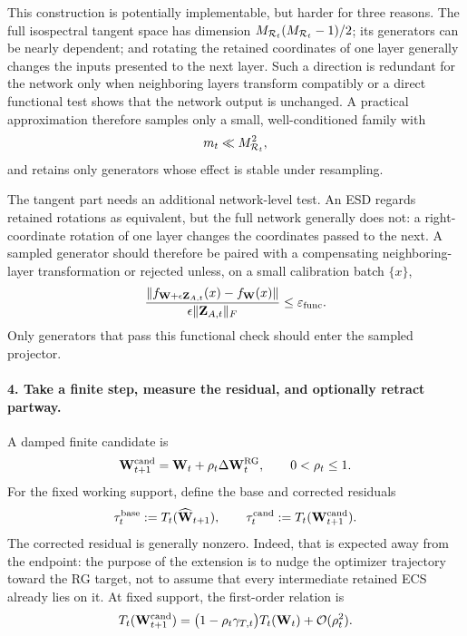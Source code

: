 This construction is potentially implementable, but harder for three reasons.  The full isospectral tangent space has dimension $M_{\mathcal R_t}(M_{\mathcal R_t}-1)/2$; its generators can be nearly dependent; and rotating the retained coordinates of one layer generally changes the inputs presented to the next layer.  Such a direction is redundant for the network only when neighboring layers transform compatibly or a direct functional test shows that the network output is unchanged.  A practical approximation therefore samples only a small, well-conditioned family with
\begin{equation}
  m_t\ll M_{\mathcal R_t}^{2},
  \label{eq:sampled_redundant_basis}
\end{equation}
and retains only generators whose effect is stable under resampling.

The tangent part needs an additional network-level test.  An ESD regards retained rotations as equivalent, but the full network generally does not: a right-coordinate rotation of one layer changes the coordinates passed to the next.  A sampled generator should therefore be paired with a compensating neighboring-layer transformation or rejected unless, on a small calibration batch $\{x\}$,
\begin{equation}
  \frac{
    \|f_{\mathbf W+\epsilon\mathbf Z_{A,t}}(x)-f_{\mathbf W}(x)\|
  }{
    \epsilon\|\mathbf Z_{A,t}\|_F
  }
  \leq\varepsilon_{\rm func}.
  \label{eq:functional_redundancy_test}
\end{equation}
Only generators that pass this functional check should enter the sampled projector.

\paragraph{4. Take a finite step, measure the residual, and optionally retract partway.}
A damped finite candidate is
\begin{equation}
  \mathbf W_{t+1}^{\rm cand}
  =
  \mathbf W_t+\rho_t\Delta\mathbf W_t^{\rm RG},
  \qquad 0<\rho_t\leq1.
  \label{eq:damped_projected_candidate}
\end{equation}
For the fixed working support, define the base and corrected residuals
\begin{equation}
  \tau_t^{\rm base}
  :=T_t(\widehat{\mathbf W}_{t+1}),
  \qquad
  \tau_t^{\rm cand}
  :=T_t(\mathbf W_{t+1}^{\rm cand}).
  \label{eq:finite_trace_log_residual}
\end{equation}
The corrected residual is generally nonzero.  Indeed, that is expected away from the endpoint: the purpose of the extension is to nudge the optimizer trajectory toward the RG target, not to assume that every intermediate retained ECS already lies on it.  At fixed support, the first-order relation is
\begin{equation}
  T_t(\mathbf W_{t+1}^{\rm cand})
  =
  \bigl(1-\rho_t\gamma_{T,t}\bigr)T_t(\mathbf W_t)
  +\mathcal O(\rho_t^2).
  \label{eq:trace_log_tracking_rate}
\end{equation}

